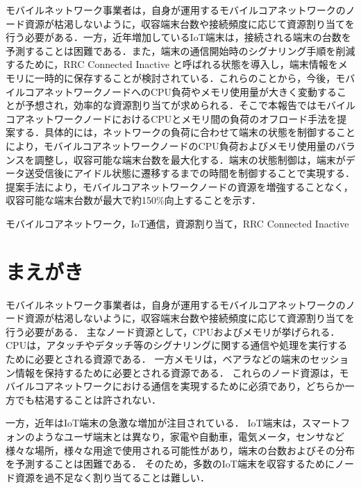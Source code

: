 \documentclass[technicalreport]{ieicej-rev}
\begin{document}
\begin{jabstract}
モバイルネットワーク事業者は，自身が運用するモバイルコアネットワークのノード資源が枯渇しないように，収容端末台数や接続頻度に応じて資源割り当てを行う必要がある．一方，近年増加しているIoT端末は，接続される端末の台数を予測することは困難である．また，端末の通信開始時のシグナリング手順を削減するために，RRC Connected Inactive と呼ばれる状態を導入し，端末情報をメモリに一時的に保存することが検討されている．これらのことから，今後，モバイルコアネットワークノードへのCPU負荷やメモリ使用量が大きく変動することが予想され，効率的な資源割り当てが求められる．そこで本報告ではモバイルコアネットワークノードにおけるCPUとメモリ間の負荷のオフロード手法を提案する．具体的には，ネットワークの負荷に合わせて端末の状態を制御することにより，モバイルコアネットワークノードのCPU負荷およびメモリ使用量のバランスを調整し，収容可能な端末台数を最大化する．端末の状態制御は，端末がデータ送受信後にアイドル状態に遷移するまでの時間を制御することで実現する．提案手法により，モバイルコアネットワークノードの資源を増強することなく，収容可能な端末台数が最大で約150\%向上することを示す．
\end{jabstract}
\begin{jkeyword}
モバイルコアネットワーク，IoT通信，資源割り当て，RRC Connected Inactive
\end{jkeyword}
\maketitle




\section{まえがき}
\label{sec:abs}
モバイルネットワーク事業者は，自身が運用するモバイルコアネットワークのノード資源が枯渇しないように，収容端末台数や接続頻度に応じて資源割り当てを行う必要がある．
主なノード資源として，CPUおよびメモリが挙げられる．
CPUは，アタッチやデタッチ等のシグナリングに関する通信や処理を実行するために必要とされる資源である．
一方メモリは，ベアラなどの端末のセッション情報を保持するために必要とされる資源である．
これらのノード資源は，モバイルコアネットワークにおける通信を実現するために必須であり，どちらか一方でも枯渇することは許されない．


一方，近年はIoT端末の急激な増加が注目されている．
IoT端末は，スマートフォンのようなユーザ端末とは異なり，家電や自動車，電気メータ，センサなど様々な場所，様々な用途で使用される可能性があり，端末の台数およびその分布を予測することは困難である．
そのため，多数のIoT端末を収容するためにノード資源を過不足なく割り当てることは難しい．
\end{document}
